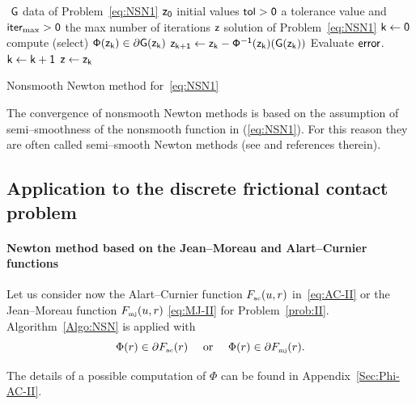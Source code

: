 {\begin{algorithm}
  \begin{algorithmic}
    {\sf
      \STATE $ $
      \REQUIRE $\sf G $ data of Problem~\eqref{eq:NSN1}
      \REQUIRE $\sf z_0$ initial values
      \REQUIRE $\sf tol >0$ a tolerance value and $\sf iter_{\max}  >0$ the max number of iterations
      \ENSURE  $\sf z$ solution of Problem~\eqref{eq:NSN1}
      \STATE   $\sf k \leftarrow 0$ 
      \STATE compute (select) $\sf \Phi(z_k) \in \partial G(z_k)$
      \STATE $\sf z_{k+1} \leftarrow   z_k -  \Phi^{-1}(z_k) (G(z_k))$
      \STATE Evaluate $\sf error$.
      \STATE $\sf k \leftarrow k+1$
      \ENDWHILE
      \STATE $\sf z \leftarrow z_{k}$ 
    }
  \end{algorithmic}
  \caption{Nonsmooth Newton method for~\eqref{eq:NSN1}}  \label{Algo:NSN}
\end{algorithm}

The convergence of nonsmooth Newton methods is based on the assumption of semi--smoothness of the nonsmooth function in (\ref{eq:NSN1}). For this reason they are often called semi--smooth Newton methods  (see \citep[Section 7.5]{Facchinei.Pang2003} and references therein).
\subsection{Application to  the discrete frictional contact problem}



\paragraph{Newton method based on the Jean--Moreau and  Alart--Curnier functions}
\label{Sec:NSN-AC}


Let us consider now the Alart--Curnier function $F_{{\hbox{\tiny{ac}}}}(u,r)$ in~\eqref{eq:AC-II} or the Jean--Moreau function $F_{{\hbox{\tiny{mj}}}}(u,r)$ \eqref{eq:MJ-II} for Problem~\ref{prob:II}. 
Algorithm~\ref{Algo:NSN} is applied with
\begin{equation}  \label{eq:phiphi-ac}
    \Phi(r) \in \partial F_{\actwo}(r)\quad\text{ or } \quad   \Phi(r) \in \partial F_{\mjtwo}(r).
\end{equation}}
The details of a possible computation of $\Phi$ can be found in Appendix~\ref{Sec:Phi-AC-II}.

